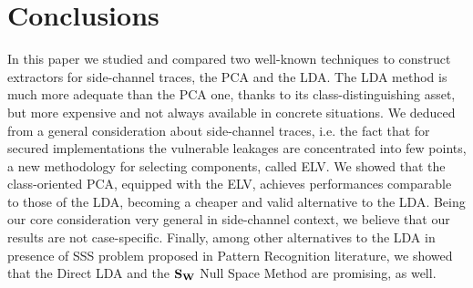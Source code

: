 \section{Conclusions}\label{sec:conclusions}

In this paper we studied and compared two well-known techniques to construct extractors for side-channel traces, the PCA and the LDA. The LDA method is much more adequate than the PCA one, thanks to its class-distinguishing asset, but more expensive and not always available in concrete situations. We deduced from a general consideration about side-channel traces, i.e. the fact that for secured implementations the vulnerable leakages are concentrated into few points, a new methodology  for selecting components, called ELV. We showed that the class-oriented PCA, equipped with the ELV, achieves performances comparable to those of the LDA, becoming a cheaper and valid alternative to the LDA. Being our core consideration very general in side-channel context, we believe that our results are not case-specific. Finally, among other alternatives to the LDA in presence of SSS problem proposed in Pattern Recognition literature, we showed that the Direct LDA and the $\textbf{S}_{\textbf{W}}$ Null Space Method are promising, as well.


